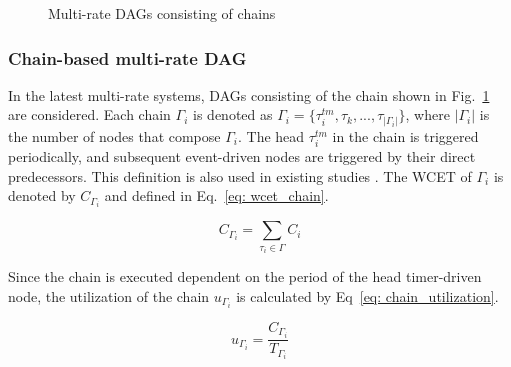 \begin{figure}[tb]
    \centering
    \caption{Multi-rate DAGs consisting of chains}
    \label{fig: chain_dag}
\end{figure}


\subsubsection{Chain-based multi-rate DAG}
\label{sssec: dag_chain}

In the latest multi-rate systems, DAGs consisting of the chain shown in Fig.~\ref{fig: chain_dag} are considered.
Each chain $\Gamma_i$ is denoted as $\Gamma_i = \{\tau^{tm}_i, \tau_k, ..., \tau_{|\Gamma_i|}\}$, where $|\Gamma_i|$ is the number of nodes that compose $\Gamma_i$.
The head $\tau^{tm}_i$ in the chain is triggered periodically, and subsequent event-driven nodes are triggered by their direct predecessors.
This definition is also used in existing studies \cite{choi2020chain, tang2020response}.
The WCET of $\Gamma_i$ is denoted by $C_{\Gamma_i}$ and defined in Eq.~\ref{eq: wcet_chain}.

\begin{equation}
    \label{eq: wcet_chain}
    C_{\Gamma_i} = \sum_{\tau_i \in \Gamma}C_i
\end{equation}

Since the chain is executed dependent on the period of the head timer-driven node, the utilization of the chain $u_{\Gamma_i}$ is calculated by Eq~\ref{eq: chain_utilization}.

\begin{equation}
    \label{eq: chain_utilization}
    u_{\Gamma_i} = \frac{C_{\Gamma_i}}{T_{\Gamma_i}}
\end{equation}

